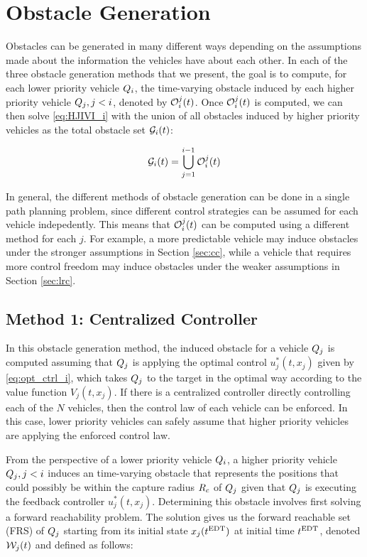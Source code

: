 \section{Obstacle Generation \label{sec:obs_gen}}
Obstacles can be generated in many different ways depending on the assumptions made about the information the vehicles have about each other. In each of the three obstacle generation methods that we present, the goal is to compute, for each lower priority vehicle $Q_i$, the time-varying obstacle induced by each higher priority vehicle $Q_j, j < i$, denoted by $\mathcal{O}_i^j(t)$. Once $\mathcal{O}_i^j(t)$ is computed, we can then solve \eqref{eq:HJIVI_i} with the union of all obstacles induced by higher priority vehicles as the total obstacle set $\mathcal{G}_i(t)$:

\begin{equation}
\mathcal{G}_i(t) = \bigcup_{j=1}^{i-1}\mathcal{O}_i^j(t)
\end{equation}

In general, the different methods of obstacle generation can be done in a single path planning problem, since different control strategies can be assumed for each vehicle indepedently. This means that $\mathcal{O}_i^j(t)$ can be computed using a different method for each $j$. For example, a more predictable vehicle may induce obstacles under the stronger assumptions in Section \ref{sec:cc}, while a vehicle that requires more control freedom may induce obstacles under the weaker assumptions in Section \ref{sec:lrc}.

\subsection{Method 1: Centralized Controller \label{sec:cc}}
In this obstacle generation method, the induced obstacle for a vehicle $Q_j$ is computed assuming that $Q_j$ is applying the optimal control $u_j^*(t, x_j)$ given by \eqref{eq:opt_ctrl_i}, which takes $Q_j$ to the target in the optimal way according to the value function $V_j(t, x_j)$. If there is a centralized controller directly controlling each of the $N$ vehicles, then the control law of each vehicle can be enforced. In this case, lower priority vehicles can safely assume that higher priority vehicles are applying the enforced control law. 

From the perspective of a lower priority vehicle $Q_i$, a higher priority vehicle $Q_j, j < i$ induces an time-varying obstacle that represents the positions that could possibly be within the capture radius $R_c$ of $Q_j$ given that $Q_j$ is executing the feedback controller $u_j^*(t, x_j)$. Determining this obstacle involves first solving a forward reachability problem. The solution gives us the forward reachable set (FRS) of $Q_j$ starting from its initial state $x_j(t^\text{EDT})$ at initial time $t^\text{EDT}$, denoted $\mathcal{W}_j(t)$ and defined as follows:

